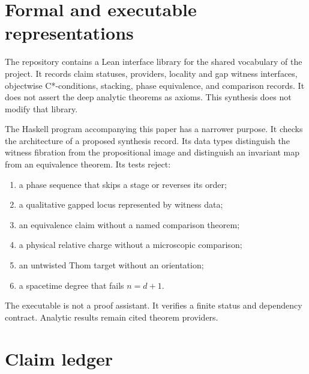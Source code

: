 \documentclass[12pt]{article}
\theoremstyle{definition}
\theoremstyle{remark}
\begin{document}
\section{Formal and executable representations}

The repository contains a Lean interface library for the shared vocabulary
of the project.  It records claim statuses, providers, locality and gap
witness interfaces, objectwise C*-conditions, stacking, phase equivalence,
and comparison records.  It does not assert the deep analytic theorems as
axioms.  This synthesis does not modify that library.

The Haskell program accompanying this paper has a narrower purpose.  It
checks the architecture of a proposed synthesis record.  Its data types
distinguish the witness fibration from the propositional image and distinguish
an invariant map from an equivalence theorem.  Its tests reject:
\begin{enumerate}[leftmargin=2.2em]
  \item a phase sequence that skips a stage or reverses its order;
  \item a qualitative gapped locus represented by witness data;
  \item an equivalence claim without a named comparison theorem;
  \item a physical relative charge without a microscopic comparison;
  \item an untwisted Thom target without an orientation;
  \item a spacetime degree that fails $n=d+1$.
\end{enumerate}

The executable is not a proof assistant.  It verifies a finite status and
dependency contract.  Analytic results remain cited theorem providers.

\section{Claim ledger}
\end{document}
